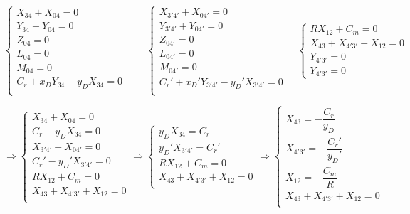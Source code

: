 \documentclass[10pt]{article}
\begin{document}
$$
\left\{
\begin{array}{l}
{X_{34}}+{X_{04}}=0 \\
{Y_{34}}+{Y_{04}}=0 \\
{Z_{04}}=0 \\
{L_{04}}=0\\
{M_{04}}=0\\
{C_r}+{x_DY_{34}-y_DX_{34}}=0 \\
\end{array}
\right.
\quad \quad
\left\{
\begin{array}{l}
{X_{3'4'}}+{X_{04'}}=0 \\
{Y_{3'4'}}+{Y_{04'}}=0 \\
{Z_{04'}}=0 \\
{L_{04'}}=0\\
{M_{04'}}=0\\
{C_r'}+{x_D'Y_{3'4'}-y_D'X_{3'4'}}=0 \\
\end{array}
\right.
\quad 
\left\{
\begin{array}{l}
R X_{12} + C_m = 0\\
X_{43}+X_{4'3'}+X_{12}=0\\
Y_{4'3'}=0\\
Y_{4'3'}=0
\end{array}
\right.
$$


$$
\Longrightarrow
\left\{
\begin{array}{l}
{X_{34}}+{X_{04}}=0 \\
{C_r}-y_DX_{34}=0 \\
{X_{3'4'}}+{X_{04'}}=0 \\
{C_r'}-y_D'X_{3'4'}=0 \\
R X_{12} + C_m = 0\\
X_{43}+X_{4'3'}+X_{12}=0\\
\end{array}
\right.
\Longrightarrow
\left\{
\begin{array}{l}
y_DX_{34}={C_r} \\
y_D'X_{3'4'}={C_r'} \\
R X_{12} + C_m = 0\\
X_{43}+X_{4'3'}+X_{12}=0\\
\end{array}
\right.
\Longrightarrow
\left\{
\begin{array}{l}
X_{43}=-\dfrac{C_r}{y_D} \\
X_{4'3'}=-\dfrac{C_r'}{y_D'} \\
X_{12} = -\dfrac{C_m}{R}\\
X_{43}+X_{4'3'}+X_{12}=0\\
\end{array}
\right.
$$
\end{document}
